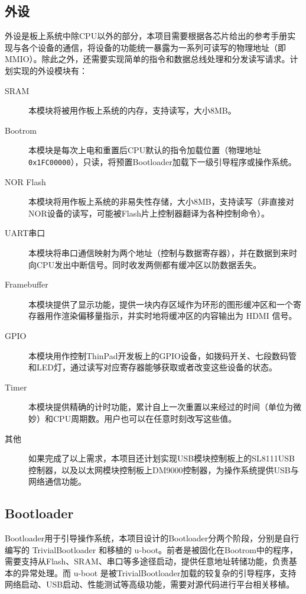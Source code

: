 \subsection{外设}

外设是板上系统中除CPU以外的部分，本项目需要根据各芯片给出的参考手册实现与各个设备的通信，将设备的功能统一暴露为一系列可读写的物理地址（即MMIO）。除此之外，还需要实现简单的指令和数据总线处理和分发读写请求。计划实现的外设模块有：

\begin{description}

    \item[SRAM] 本模块将被用作板上系统的内存，支持读写，大小8MB。
    \item[Bootrom] 本模块是每次上电和重置后CPU默认的指令加载位置（物理地址 \texttt{0x1FC00000}），只读，将预置Bootloader加载下一级引导程序或操作系统。
    \item[NOR Flash] 本模块将用作板上系统的非易失性存储，大小8MB，支持读写（非直接对NOR设备的读写，可能被Flash片上控制器翻译为各种控制命令）。
    \item[UART串口] 本模块将串口通信映射为两个地址（控制与数据寄存器），并在数据到来时向CPU发出中断信号。同时收发两侧都有缓冲区以防数据丢失。
    \item[Framebuffer] 本模块提供了显示功能，提供一块内存区域作为环形的图形缓冲区和一个寄存器用作渲染偏移量指示，并实时地将缓冲区的内容输出为 HDMI 信号。
    \item[GPIO] 本模块用作控制ThinPad开发板上的GPIO设备，如拨码开关、七段数码管和LED灯，通过读写对应寄存器能够获取或者改变这些设备的状态。
    \item[Timer] 本模块提供精确的计时功能，累计自上一次重置以来经过的时间（单位为微妙）和CPU周期数。用户也可以在任意时刻改写这些值。
    \item[其他] 如果完成了以上需求，本项目还计划实现USB模块控制板上的SL8111USB控制器，以及以太网模块控制板上DM9000控制器，为操作系统提供USB与网络通信功能。

\end{description}

\subsection{Bootloader}

Bootloader用于引导操作系统，本项目设计的Bootloader分两个阶段，分别是自行编写的 TrivialBootloader 和移植的 u-boot。前者是被固化在Bootrom中的程序，需要支持从Flash、SRAM、串口等多途径启动，提供任意地址转储功能，负责基本的异常处理。而 u-boot 是被TrivialBootloader加载的较复杂的引导程序，支持网络启动、USB启动、性能测试等高级功能，需要对源代码进行平台相关移植。

